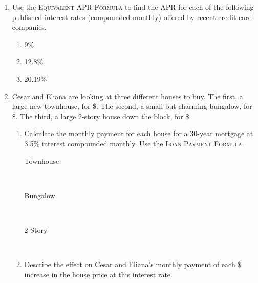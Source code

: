 \begin{enumerate}
\item Use the \textsc{Equivalent APR Formula} to find the APR for each of the following published interest rates (compounded monthly) offered by recent credit card companies.
\bigskip

\begin{enumerate}
\item 9\% \vfill
\item 12.8\%   \vfill
\item 20.19\% \vfill
\end{enumerate}

\newpage %

\item  Cesar and Eliana are looking at three different houses to buy.  The first, a large new townhouse, for \$.  The second, a small but charming bungalow, for \$.  The third, a large 2-story house down the block, for \$. 
 \begin{enumerate}
\item Calculate the monthly payment for each house for a 30-year mortgage at 3.5\% interest compounded monthly.   Use the \textsc{Loan Payment Formula}. 
\bigskip

\begin{description}
\item[Townhouse] ~\vfill
\item [Bungalow] ~\vfill
\item [2-Story] ~\vfill
\end{description}
\item Describe the effect on Cesar and Eliana's monthly payment of each \$ increase in the house price  at this interest rate. \vfill
\end{enumerate}

\end{enumerate}

